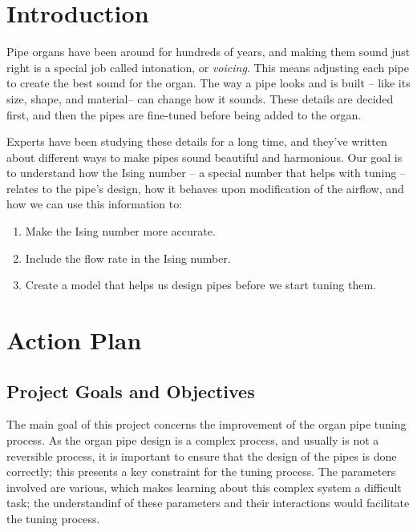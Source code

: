 \documentclass{psu-plan}
\begin{document}

\section{Introduction}

Pipe organs have been around for hundreds of years, and making them sound just
right is a special job called intonation, or \emph{voicing}.
This means adjusting each pipe to create the best sound for the organ.
The way a pipe looks and is built -- like its size, shape, and material-- can
change how it sounds.
These details are decided first, and then the pipes are fine-tuned before being
added to the organ.

Experts have been studying these details for a long time, and they’ve written
about different ways to make pipes sound beautiful and harmonious.
Our goal is to understand how the Ising number -- a special number that helps
with tuning -- relates to the pipe’s design, how it behaves upon modification of
the airflow, and how we can use this information to:
\begin{enumerate}
    \item Make the Ising number more accurate.
    \item Include the flow rate in the Ising number.
    \item Create a model that helps us design pipes before we start tuning them.
\end{enumerate}

\section{Action Plan}


\subsection{Project Goals and Objectives}

The main goal of this project concerns the improvement of the organ pipe tuning
process.
As the organ pipe design is a complex process, and usually is not a reversible
process, it is important to ensure that the design of the pipes is done
correctly; this presents a key constraint for the tuning process.
The parameters involved are various, which makes learning about this complex
system a difficult task; the understandinf of these parameters and their
interactions would facilitate the tuning process.
\end{document}
